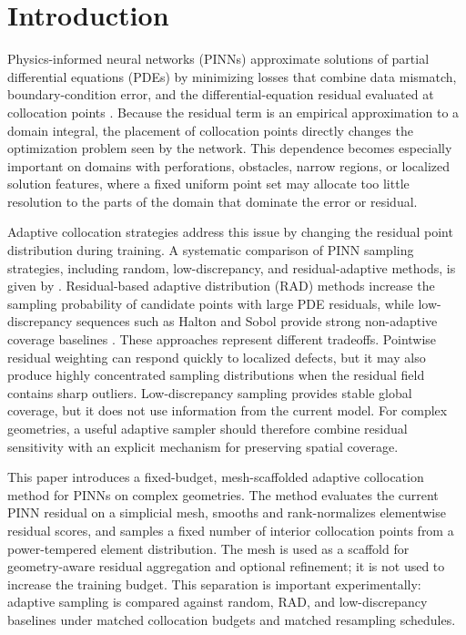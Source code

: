 \section{Introduction}
\label{sec:introduction}

Physics-informed neural networks (PINNs) approximate solutions of partial
differential equations (PDEs) by minimizing losses that combine data mismatch,
boundary-condition error, and the differential-equation residual evaluated at
collocation points \cite{raissi2019physics,karniadakis2021physics}.  Because the
residual term is an empirical approximation to a domain integral, the placement
of collocation points directly changes the optimization problem seen by the
network.  This dependence becomes especially important on domains with
perforations, obstacles, narrow regions, or localized solution features, where a
fixed uniform point set may allocate too little resolution to the parts of the
domain that dominate the error or residual.

Adaptive collocation strategies address this issue by changing the residual
point distribution during training.  A systematic comparison of PINN sampling
strategies, including random, low-discrepancy, and residual-adaptive methods, is
given by \cite{wu2023comprehensive}.  Residual-based adaptive distribution (RAD)
methods increase the sampling probability of candidate points with large PDE
residuals, while low-discrepancy sequences such as Halton and Sobol provide
strong non-adaptive coverage baselines
\cite{halton1960efficiency,sobol1967distribution}.  These approaches represent
different tradeoffs.  Pointwise residual weighting can respond quickly to
localized defects, but it may also produce highly concentrated sampling
distributions when the residual field contains sharp outliers.  Low-discrepancy
sampling provides stable global coverage, but it does not use information from
the current model.  For complex geometries, a useful adaptive sampler should
therefore combine residual sensitivity with an explicit mechanism for preserving
spatial coverage.

This paper introduces a fixed-budget, mesh-scaffolded adaptive collocation
method for PINNs on complex geometries.  The method evaluates the current PINN
residual on a simplicial mesh, smooths and rank-normalizes elementwise residual
scores, and samples a fixed number of interior collocation points from a
power-tempered element distribution.  The mesh is used as a scaffold for
geometry-aware residual aggregation and optional refinement; it is not used to
increase the training budget.  This separation is important experimentally:
adaptive sampling is compared against random, RAD, and low-discrepancy baselines
under matched collocation budgets and matched resampling schedules.

